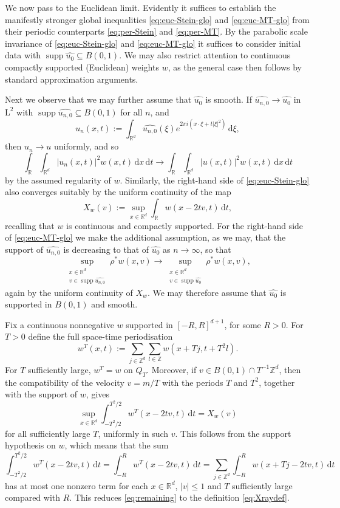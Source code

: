 \documentclass[10pt,a4paper]{amsart}
\numberwithin{equation}{section}
\newcommand{\supp}{\operatorname{supp}}
\newcommand{\dd}{\,\mathrm{d}}
\renewcommand{\leq}{\leqslant}
\begin{document}
We now pass to the Euclidean limit. 
Evidently it suffices to establish the manifestly stronger global inequalities \eqref{eq:euc-Stein-glo} and \eqref{eq:euc-MT-glo} from their periodic counterparts \eqref{eq:per-Stein} and \eqref{eq:per-MT}. By the parabolic scale invariance of \eqref{eq:euc-Stein-glo} and \eqref{eq:euc-MT-glo} it suffices to consider initial data with $\supp\widehat{u_0}\subseteq B(0,1)$.
We may also restrict attention to continuous compactly supported (Euclidean) weights $w$, as the general case then follows by standard approximation arguments.

Next we observe that we may further assume that $\widehat{u_0}$ is smooth. If $\widehat{u_{n,0}}\to\widehat{u_0}$ in $\mathrm{L}^2$ with $\supp\widehat{u_{n,0}}\subseteq B(0,1)$ for all $n$, and
\[ u_n(x,t):=\int_{\mathbb{R}^d}\widehat{u_{n,0}}(\xi)e^{2\pi i(x\cdot\xi+t|\xi|^2)}\dd\xi, \]
then $u_n\to u$ uniformly, and so
\[ \int_{\mathbb{R}}\int_{\mathbb{R}^d}|u_n(x,t)|^2w(x,t)\dd x\dd t
\longrightarrow
\int_{\mathbb{R}}\int_{\mathbb{R}^d}|u(x,t)|^2w(x,t)\dd x\dd t \]
by the assumed regularity of $w$.
Similarly, the right-hand side of \eqref{eq:euc-Stein-glo} also converges suitably by the uniform continuity of the map
\begin{equation}\label{eq:Xraydef}
X_w(v):= \sup_{x\in\mathbb{R}^d}\int_{\mathbb{R}}w(x-2tv,t)\dd t,
\end{equation} 
recalling that $w$ is continuous and compactly supported. For the right-hand side of \eqref{eq:euc-MT-glo} we make the additional assumption, as we may, that the support of $\widehat{u_{n,0}}$ is decreasing to that of $\widehat{u_0}$ as $n\rightarrow\infty$, so that
\[ \sup_{\substack{x\in\mathbb{R}^d\\ v\in\supp\widehat{u_{n,0}}}}\!\!\!\!\rho^{\ast}w(x,v)\rightarrow \sup_{\substack{x\in\mathbb{R}^d\\ v\in\supp\widehat{u_0}}}\!\!\!\!\rho^{\ast}w(x,v), \]
again by the uniform continuity of $X_w$.
We may therefore assume that $\widehat{u_0}$ is supported in $B(0,1)$ and smooth.

Fix a continuous nonnegative $w$ supported in $[-R,R]^{d+1}$, for some $R>0$.
For $T>0$ define the full space-time periodisation
\[ w^T(x,t):=\sum_{j\in\mathbb{Z}^d}\sum_{l\in\mathbb{Z}}w(x+Tj,t+T^2l). \]
For $T$ sufficiently large, $w^T=w$ on $Q_T$. Moreover, if $v\in B(0,1)\cap T^{-1}\mathbb{Z}^d$, then the compatibility of the velocity $v=m/T$ with the periods $T$ and $T^2$, together with the support of $w$, gives
\begin{equation}\label{eq:remaining}
\sup_{x\in\mathbb{R}^d} \int_{-T^2/2}^{T^2/2} w^T(x-2tv,t)\dd t=X_w(v)
\end{equation}
for all sufficiently large $T$, uniformly in such $v$.
This follows from the support hypothesis on $w$, which means that the sum
\[ \int_{-T^2/2}^{T^2/2} w^T(x-2tv,t) \dd t=\int_{-R}^{R}w^T(x-2tv,t)\dd t=\sum_{j\in\mathbb{Z}^d}\int_{-R}^{R}w(x+Tj-2tv,t)\dd t \]
has at most one nonzero term for each $x\in\mathbb{R}^d$, $|v|\leq 1$ and $T$ sufficiently large compared with $R$. This reduces \eqref{eq:remaining} to the definition \eqref{eq:Xraydef}.
\end{document}

